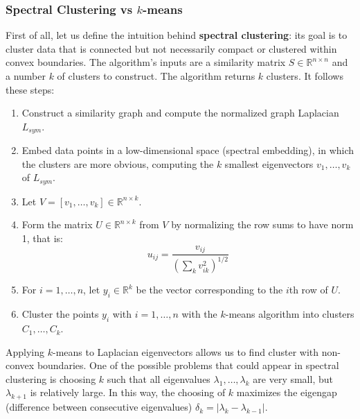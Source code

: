 \subsubsection{Spectral Clustering vs $k$-means}
First of all, let us define the intuition behind \textbf{spectral clustering}: its goal is to cluster data that is connected but not necessarily compact or clustered within convex boundaries. The algorithm's inputs are a similarity matrix $S \in \mathbb{ R }^{n \times n}$ and a number $k$ of clusters to construct. The algorithm returns $k$ clusters. It follows these steps:
\begin{enumerate}
	\item Construct a similarity graph and compute the normalized graph Laplacian $L_{sym}$.
	\item Embed data points in a low-dimensional space (spectral embedding), in which the clusters are more obvious, computing the $k$ smallest eigenvectors $v_1, \dots, v_k$ of $L_{sym}$. 
	\item Let $V=\left[v_1,\dots, v_k \right] \in \mathbb{ R }^{n \times k}$.
	\item Form the matrix $U \in \mathbb{ R }^{n \times k}$ from $V$ by normalizing the row sums to have norm 1, that is: 
	$$u_ { i j } = \frac { v _ { i j } } { \left( \sum _ { k } v _ { i k } ^ { 2 } \right) ^ { 1 / 2 } }$$
	\item For $i=1,\dots, n$, let $y _ { i } \in \mathbb { R } ^ { k }$ be the vector corresponding to the $i$th row of $U$.
	\item Cluster the points $y_i$ with $i=1,\dots,n$ with the $k$-means algorithm into clusters $C_1, \dots, C_k$.
\end{enumerate}
Applying $k$-means to Laplacian eigenvectors allows us to find cluster with non-convex boundaries.
One of the possible problems that could appear in spectral clustering is choosing $k$ such that all eigenvalues $\lambda_1, \dots, \lambda_k$ are very small, but $\lambda_{k+1}$ is relatively large. In this way, the choosing of $k$ maximizes the eigengap (difference between consecutive eigenvalues) $\delta_k = |\lambda_k - \lambda_{k-1}|$.
